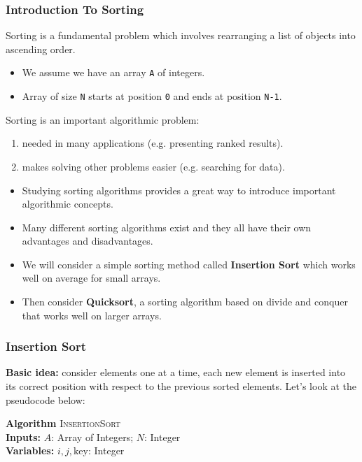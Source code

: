 \documentclass[a4paper,12pt]{article}
\begin{document}
\subsubsection{Introduction To Sorting}

Sorting is a fundamental problem which involves rearranging a list of objects into ascending order.
\begin{itemize}
    \item We assume we have an array \verb|A| of integers.
    \item Array of size \verb|N| starts at position \verb|0| and ends at position \verb|N-1|.
\end{itemize}

Sorting is an important algorithmic problem:
\begin{enumerate}
    \item needed in many applications (e.g. presenting ranked results).
    \item makes solving other problems easier (e.g. searching for data).
\end{enumerate}

\begin{itemize}
    \item Studying sorting algorithms provides a great way to introduce important algorithmic concepts.
    \item Many different sorting algorithms exist and they all have their own advantages and disadvantages.
    \item We will consider a simple sorting method called \textbf{Insertion Sort} which works well on average for small arrays.
    \item Then consider \textbf{Quicksort}, a sorting algorithm based on divide and conquer that works well on larger arrays.
\end{itemize}

\newpage

\subsubsection{Insertion Sort}

\textbf{Basic idea:} consider elements one at a time, each new element is inserted into its correct position with respect to the previous sorted elements. Let's look at the pseudocode below:

\textbf{Algorithm} \textsc{InsertionSort} \\
\textbf{Inputs:} \(A\): Array of Integers; \(N\): Integer \\
\textbf{Variables:} \(i, j, \text{key}\): Integer \\
\end{document}
